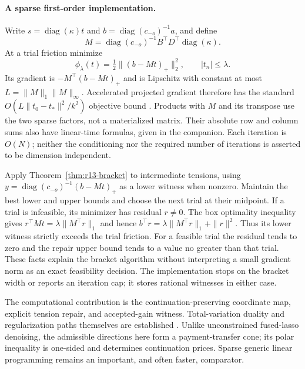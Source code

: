 \documentclass[11pt,letterpaper]{article}
\theoremstyle{definition}
\newcommand{\1}{\mathbf 1}
\begin{document}
\paragraph{A sparse first-order implementation.}
Write $s=\operatorname{diag}(\kappa)t$ and $b=\operatorname{diag}(c_{-o})^{-1}a$, and define
\[M=\operatorname{diag}(c_{-o})^{-1}B^\top D^\top\operatorname{diag}(\kappa).\]
At a trial friction minimize
\begin{equation}\label{eq:r13-feasibility}
 \phi_\lambda(t)=\tfrac12\|(b-Mt)_+\|_2^2,\qquad |t_n|\leq\lambda.
\end{equation}
Its gradient is $-M^\top(b-Mt)_+$ and is Lipschitz with constant at most $L=\|M\|_1\|M\|_\infty$. Accelerated projected gradient therefore has the standard $O(L\|t_0-t_*\|^2/k^2)$ objective bound \citep{BeckTeboulle2009}. Products with $M$ and its transpose use the two sparse factors, not a materialized matrix. Their absolute row and column sums also have linear-time formulas, given in the companion. Each iteration is $O(N)$; neither the conditioning nor the required number of iterations is asserted to be dimension independent.

Apply Theorem~\ref{thm:r13-bracket} to intermediate tensions, using
$y=\operatorname{diag}(c_{-o})^{-1}(b-Mt)_+$ as a lower witness when nonzero. Maintain the best lower and upper bounds and choose the next trial at their midpoint. If a trial is infeasible, its minimizer has residual $r\ne0$. The box optimality inequality gives
$r^\top Mt=\lambda\|M^\top r\|_1$ and hence
$b^\top r=\lambda\|M^\top r\|_1+\|r\|^2$.
Thus its lower witness strictly exceeds the trial friction. For a feasible trial the residual tends to zero and the repair upper bound tends to a value no greater than that trial. These facts explain the bracket algorithm without interpreting a small gradient norm as an exact feasibility decision. The implementation stops on the bracket width or reports an iteration cap; it stores rational witnesses in either case.

The computational contribution is the continuation-preserving coordinate map, explicit tension repair, and accepted-gain witness. Total-variation duality and regularization paths themselves are established \citep{TibshiraniTaylor2011,ArnoldTibshirani2016}. Unlike unconstrained fused-lasso denoising, the admissible directions here form a payment-transfer cone; its polar inequality is one-sided and determines continuation prices. Sparse generic linear programming remains an important, and often faster, comparator.
\end{document}
